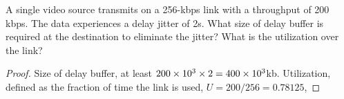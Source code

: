 \documentclass[./answersheet.tex]{subfiles}
\begin{document}
\begin{wts}
    A single video source transmits on a 256-kbps link with a throughput of 200 kbps. The data experiences a delay jitter of 2s. What size of delay buffer is required at the destination to eliminate the jitter? What is the utilization over the link?
\end{wts}
\begin{proof}
    Size of delay buffer, at least $200\times 10^{3}\times2=400\times 10^{3}$kb. Utilization, defined as the fraction of time the link is used, $U=200/256=0.78125$,
\end{proof}
\end{document}

